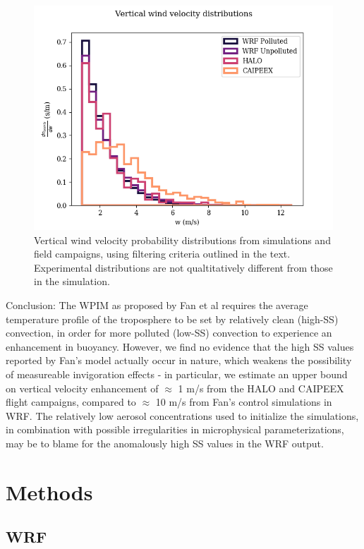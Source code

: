 \documentclass{article}
\begin{document}
\begin{figure}[ht]
    \centering
    \includegraphics[width=12cm]{revmywrf/v3_FINAL_combined_w_hist_figure.png}
    \caption{Vertical wind velocity probability distributions from simulations and field campaigns, using filtering criteria outlined in the text. Experimental distributions are not qualtitatively different from those in the simulation.}
    \label{combinedwhist}
\end{figure}

Conclusion: The WPIM as proposed by Fan et al requires the average temperature profile of the troposphere to be set by relatively clean (high-SS) convection, in order for more polluted (low-SS) convection to experience an enhancement in buoyancy. However, we find no evidence that the high SS values reported by Fan's model actually occur in nature, which weakens the possibility of measureable invigoration effects - in particular, we estimate an upper bound on vertical velocity enhancement of $\approx$ 1 m/s from the HALO and CAIPEEX flight campaigns, compared to $\approx$ 10 m/s from Fan's control simulations in WRF. The relatively low aerosol concentrations used to initialize the simulations, in combination with possible irregularities in microphysical parameterizations, may be to blame for the anomalously high SS values in the WRF output.

\clearpage
\newpage

\section{Methods}

\subsection{WRF}
\end{document}
